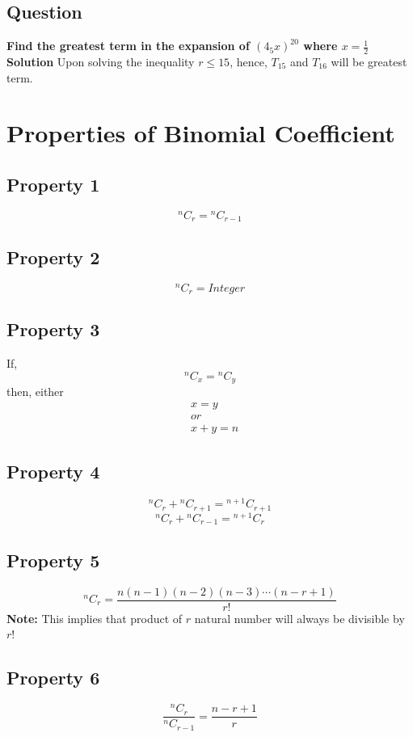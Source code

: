 \documentclass[12pt]{article}
\begin{document}
\subsection*{Question}
\textbf{Find the greatest term in the expansion of $(4_5x)^{20}$ where $x= \frac{1}{2}$}\\
\textbf{Solution} Upon solving the inequality $r \leq 15$, hence, $T_{15}$ and $T_{16}$ will be greatest term.

\newpage
\section{Properties of Binomial Coefficient}
\subsection*{Property 1}
\[
\boxed{{}^{n}C_{r} = {}^{n}C_{r-1}}
\]

\subsection*{Property 2}
\[
\boxed{{}^{n}C_{r} = Integer}
\]

\subsection*{Property 3}
If,
\[
\boxed{{}^{n}C_{x} = {}^{n}C_{y}}
\]
then, either
\[
\begin{aligned}
    &x = y \\
    &or \\
    &x+y = n
\end{aligned}
\]

\subsection*{Property 4}
\[
\boxed{{}^{n}C_{r} + {}^{n}C_{r+1} = {}^{n+1}C_{r+1}}
\]
\[
\boxed{{}^{n}C_{r}+{}^{n}C_{r-1} = {}^{n+1}C_{r}}
\]

\subsection*{Property 5}
\[
\boxed{{}^{n}C_{r} = \frac{n(n-1)(n-2)(n-3)\cdots(n-r+1)}{r!}}
\]
\textbf{Note:} This implies that product of $r$ natural number will always be divisible by $r!$

\subsection*{Property 6}
\[
\boxed{\frac{{}^{n}C_{r}}{{}^{n}C_{r-1}} = \frac{n-r+1}{r}}
\]
\end{document}
